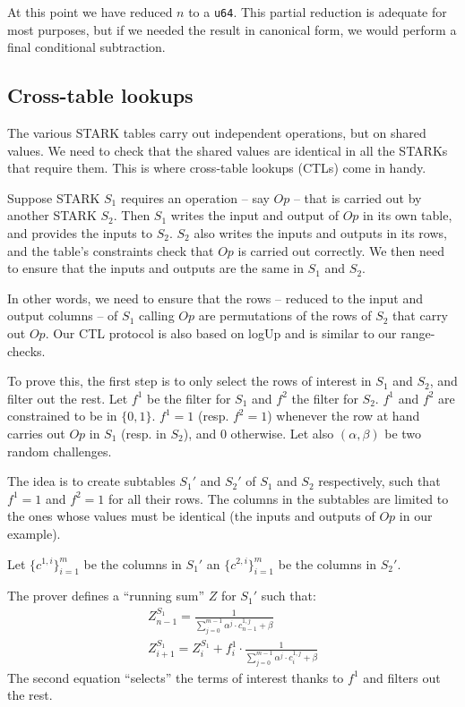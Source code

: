 At this point we have reduced $n$ to a \texttt{u64}. This partial reduction is adequate for most purposes, but if we needed the result in canonical form, we would perform a final conditional subtraction.

\subsection{Cross-table lookups}
\label{ctl}
The various STARK tables carry out independent operations, but on shared values. We need to check that the shared values are identical in all the STARKs that require them. This is where cross-table lookups (CTLs) come in handy. 

Suppose STARK $S_1$ requires an operation -- say $Op$ -- that is carried out by another STARK $S_2$. Then $S_1$ writes the input and output of $Op$ in its own table, and provides the inputs to $S_2$. $S_2$ also writes the inputs and outputs in its rows, and the table's constraints check that $Op$ is carried out correctly. We then need to ensure that the inputs and outputs are the same in $S_1$ and $S_2$.

In other words, we need to ensure that the rows -- reduced to the input and output columns -- of $S_1$ calling $Op$ are permutations of the rows of $S_2$ that carry out $Op$. Our CTL protocol is also based on logUp and is similar to our range-checks.

To prove this, the first step is to only select the rows of interest in $S_1$ and $S_2$, and filter out the rest. Let $f^1$ be the filter for $S_1$ and $f^2$ the filter for $S_2$. $f^1$ and $f^2$ are constrained to be in $\{0, 1\}$. $f^1 = 1$ (resp. $f^2 = 1$) whenever the row at hand carries out $Op$ in $S_1$ (resp. in $S_2$), and 0 otherwise. Let also $(\alpha, \beta)$ be two random challenges.

The idea is to create subtables $S_1'$ and $S_2'$ of $S_1$ and $S_2$ respectively, such that $f^1 = 1$ and $f^2 = 1$ for all their rows. The columns in the subtables are limited to the ones whose values must be identical (the inputs and outputs of $Op$ in our example).

Let $\{c^{1, i}\}_{i=1}^m$ be the columns in $S_1'$ an $\{c^{2,i}\}_{i=1}^m$ be the columns in $S_2'$.

The prover defines a ``running sum'' $Z$ for $S_1'$ such that:
\begin{gather*}
  Z^{S_1}_{n-1} = \frac{1}{\sum_{j=0}^{m-1} \alpha^j \cdot c^{1, j}_{n-1} + \beta} \\
  Z^{S_1}_{i+1} = Z^{S_1}_i + f^1_i \cdot \frac{1}{\sum_{j=0}^{m-1} \alpha^j \cdot c^{1, j}_i + \beta}
\end{gather*}
The second equation ``selects'' the terms of interest thanks to $f^1$ and filters out the rest.

